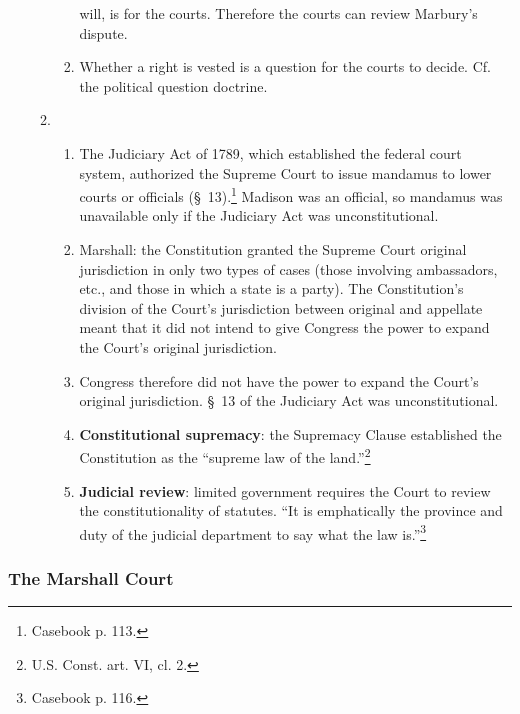 \begin{enumerate}
\begin{enumerate}
\begin{enumerate}
            will, is for the courts. Therefore the courts can review Marbury's 
            dispute.
            \item Whether a right is vested is a question for the courts to 
            decide. Cf. the political question doctrine.
        \end{enumerate}
        \item {}
        \begin{enumerate}
            \item The Judiciary Act of 1789, which established the federal 
            court system, authorized the Supreme Court to issue mandamus to 
            lower courts or officials (\S\ 13).\footnote{Casebook p. 113.}
            Madison was an official, so mandamus was unavailable only if the 
            Judiciary Act was unconstitutional.
            \item Marshall: the Constitution granted the Supreme Court 
            original jurisdiction in only two types of cases (those involving 
            ambassadors, etc., and those in which a state is a party). The 
            Constitution's division of the Court's jurisdiction between 
            original and appellate meant that it did not intend to give 
            Congress the power to expand the Court's original jurisdiction.
            \item Congress therefore did not have the power to expand the 
            Court's original jurisdiction. \S\ 13 of the Judiciary Act was 
            unconstitutional.
            \item \textbf{Constitutional supremacy}: the Supremacy Clause 
            established the Constitution as the ``supreme law of the 
            land.''\footnote{U.S. Const. art. VI, cl. 2.}
            \item \textbf{Judicial review}: limited government requires the 
            Court to review the constitutionality of statutes. ``It is 
            emphatically the province and duty of the judicial department to 
            say what the law is.''\footnote{Casebook p. 116.}
        \end{enumerate}
    \end{enumerate}
\end{enumerate}

\subsubsection{The Marshall Court}

